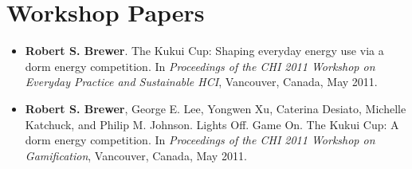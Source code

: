 \section{Workshop Papers}

\begin{itemize}

\item \textbf{Robert S. Brewer}. The Kukui Cup: Shaping everyday energy use via a dorm energy competition. In \emph{Proceedings of the CHI 2011 Workshop on Everyday Practice and Sustainable HCI}, Vancouver, Canada, May 2011.

\item \textbf{Robert S. Brewer}, George E. Lee, Yongwen Xu, Caterina Desiato, Michelle Katchuck, and Philip M. Johnson. Lights Off. Game On. The Kukui Cup: A dorm energy competition. In \emph{Proceedings of the CHI 2011 Workshop on Gamification}, Vancouver, Canada, May 2011.

\end{itemize}

